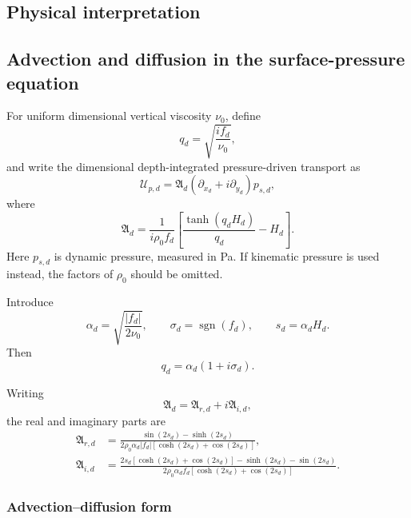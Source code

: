 \documentclass[10pt]{amsart}
\begin{document}
\subsection{Physical interpretation}

\subsection{Advection and diffusion in the surface-pressure equation}

For uniform dimensional vertical viscosity \(\nu_0\), define
\begin{equation}
q_d
=
\sqrt{\frac{i f_d}{\nu_0}},
\end{equation}
and write the dimensional depth-integrated pressure-driven transport as
\begin{equation}
\mathcal U_{p,d}
=
\mathfrak A_d
\left(
\partial_{x_d}+i\partial_{y_d}
\right)p_{s,d},
\end{equation}
where
\begin{equation}
\mathfrak A_d
=
\frac{1}{i\rho_0f_d}
\left[
\frac{\tanh(q_dH_d)}{q_d}-H_d
\right].
\end{equation}
Here \(p_{s,d}\) is dynamic pressure, measured in Pa. If kinematic
pressure is used instead, the factors of \(\rho_0\) should be omitted.

Introduce
\begin{equation}
\alpha_d
=
\sqrt{\frac{|f_d|}{2\nu_0}},
\qquad
\sigma_d
=
\operatorname{sgn}(f_d),
\qquad
s_d
=
\alpha_dH_d.
\end{equation}
Then
\begin{equation}
q_d
=
\alpha_d(1+i\sigma_d).
\end{equation}

Writing
\begin{equation}
\mathfrak A_d
=
\mathfrak A_{r,d}
+i\mathfrak A_{i,d},
\end{equation}
the real and imaginary parts are
\begin{subequations}
\begin{align}
\mathfrak A_{r,d}
&=
\frac{
\sin(2s_d)-\sinh(2s_d)
}{
2\rho_0\alpha_d|f_d|
\left[
\cosh(2s_d)+\cos(2s_d)
\right]
},
\\[1ex]
\mathfrak A_{i,d}
&=
\frac{
2s_d
\left[
\cosh(2s_d)+\cos(2s_d)
\right]
-\sinh(2s_d)-\sin(2s_d)
}{
2\rho_0\alpha_df_d
\left[
\cosh(2s_d)+\cos(2s_d)
\right]
}.
\end{align}
\end{subequations}


\subsubsection{Advection--diffusion form}
\end{document}
